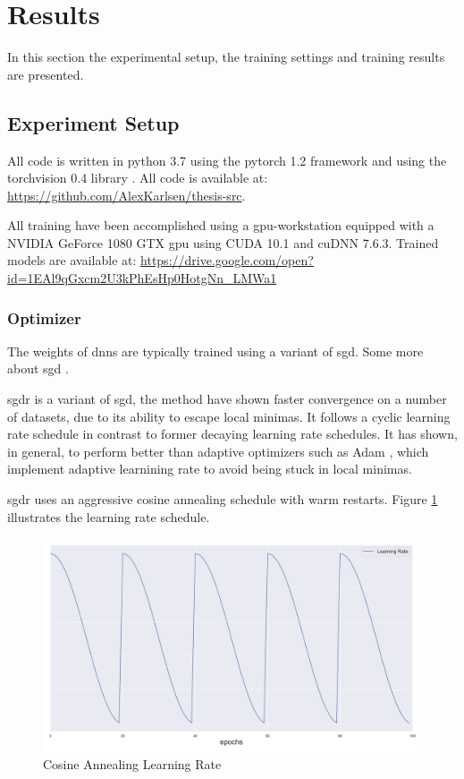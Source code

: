 
\section{Results}

In this section the experimental setup, the training settings and training results are presented.  

\subsection{Experiment Setup}

All code is written in \gls{python} 3.7 \cite{van_rossum_python_1995} using the \gls{pytorch} 1.2
framework \cite{paszke_automatic_2017} and using the \gls{torchvision} 0.4 library \cite{marcel_torchvision_2010}. All code is available at:
{\color{sns-grey}\url{https://github.com/AlexKarlsen/thesis-src}}. 

All training have been accomplished using a \gls{gpu}-workstation equipped with a NVIDIA GeForce 1080 GTX \gls{gpu} using CUDA 10.1 and cuDNN 7.6.3. Trained models are available at: {\color{sns-grey}\url{https://drive.google.com/open?id=1EAl9qGxcm2U3kPhEsHp0HotgNn_LMWa1}} 

\subsubsection{Optimizer}

The weights of \gls{dnn}s are typically trained using a variant of \gls{sgd}. Some more about \gls{sgd} \cite{goodfellow_deep_2016}.

\gls{sgdr} \cite{loshchilov_sgdr:_2016} is a variant of \gls{sgd}, the method have shown faster convergence on a number of datasets, due to its ability to escape local minimas. It follows a cyclic learning rate schedule in contrast to former decaying learning rate schedules. It has shown, in general, to perform better than adaptive optimizers such as Adam \cite{kingma_adam:_2014}, which implement adaptive learnining rate to avoid being stuck in local minimas. 

\gls{sgdr} uses an aggressive cosine annealing schedule with warm restarts. Figure \ref{fig:cosineannealing} illustrates the learning rate schedule.

\begin{figure}
	\centering
	\includegraphics[width=.7\linewidth]{figures/lr.png}
	\caption[Cosine Annealing Learning Rate]{Cosine Annealing Learning Rate} \label{fig:cosineannealing}
\end{figure}

